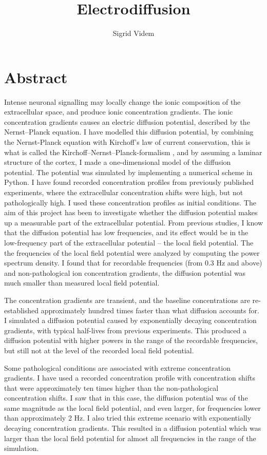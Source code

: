 \documentclass{article}
\author{Sigrid Videm}
\title{Electrodiffusion}
\begin{document}
\maketitle


\section{Abstract} 
Intense neuronal signalling may locally change the ionic composition of the extracellular space, and produce ionic concentration gradients. The ionic concentration gradients causes an electric diffusion potential, described by the Nernst--Planck equation. I have modelled this diffusion potential, by combining the Nernst-Planck equation with Kirchoff's law of current conservation, this is what is called the Kirchoff--Nernst--Planck-formalism \cite{Halnes2016}, and by assuming a laminar structure of the cortex, I made a one-dimensional model of the diffusion potential. The potential was simulated by implementing a numerical scheme in Python. I have found recorded concentration profiles from previously published experiments, where the extracellular concentration shifts were high, but not pathologically high. I used these concentration profiles as initial conditions. The aim of this project has been to investigate whether the diffusion potential makes up a measurable part of the extracellular potential. From previous studies, I know that the diffusion potential has low frequencies, and its effect would be in the low-frequency part of the extracellular potential -- the local field potential. The the frequencies of the local field potential were analyzed by computing the power spectrum density. I found that for recordable frequencies (from 0.3 Hz and above) and non-pathological ion concentration gradients, the diffusion potential was much smaller than measured local field potential. 

The concentration gradients are transient, and the baseline concentrations are re-established approximately hundred times faster than what diffusion accounts for. I simulated a diffusion potential caused by exponentially decaying concentration gradients, with typical half-lives from previous experiments. This produced a diffusion potential with higher powers in the range of the recordable frequencies, but still not at the level of the recorded local field potential. 

Some pathological conditions are associated with extreme concentration gradients. I have used a recorded concentration profile with concentration shifts that were approximately ten times higher than the non-pathological concentration shifts. I saw that in this case, the diffusion potential was of the same magnitude as the local field potential, and even larger, for frequencies lower than approximately 2 Hz. I also tried this extreme scenario with exponentially decaying concentration gradients. This resulted in a diffusion potential which was larger than the local field potential for almost all frequencies in the range of the simulation. 
\end{document}
